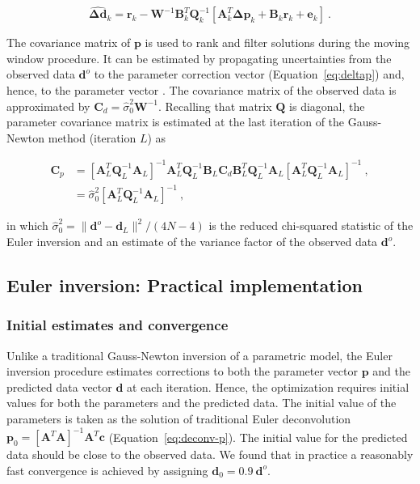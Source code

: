 \begin{equation}
  \hat{\mathbf{\Delta d}}_k =
  \mathbf{r}_k -
  \mathbf{W}^{-1}\mathbf{B}_k^T\mathbf{Q}_k^{-1}
  \left[\mathbf{A}_k^T\mathbf{\Delta p}_k + \mathbf{B}_k\mathbf{r}_k + \mathbf{e}_k\right]
  \ .
  \label{eq:deltad}
\end{equation}

The covariance matrix of $\mathbf{p}$ is used to rank and filter solutions
during the moving window procedure.
It can be estimated by propagating uncertainties from the observed data
$\mathbf{d}^o$ to the
parameter correction vector (Equation~\ref{eq:deltap}) and, hence, to the
parameter vector \citep{WellsKrakiwsky1971}.
The covariance matrix of the observed data is approximated by
$\mathbf{C}_d = \hat{\sigma}_0^2\mathbf{W}^{-1}$.
Recalling that matrix $\mathbf{Q}$ is diagonal,
the parameter covariance matrix is estimated at the last iteration of the
Gauss-Newton method (iteration $L$) as

\begin{equation}
  \begin{aligned}
    \mathbf{C}_{p} &=
      \left[\mathbf{A}_L^T\mathbf{Q}_L^{-1}\mathbf{A}_L\right]^{-1}
      \mathbf{A}_L^T\mathbf{Q}_L^{-1}\mathbf{B}_L
      \mathbf{C}_d
      \mathbf{B}_L^T\mathbf{Q}_L^{-1}\mathbf{A}_L
      \left[\mathbf{A}_L^T\mathbf{Q}_L^{-1}\mathbf{A}_L\right]^{-1}
    \ ,
    \\
    &= \hat{\sigma}_0^2 \left[\mathbf{A}_L^T\mathbf{Q}_L^{-1}\mathbf{A}_L\right]^{-1}
    \ ,
  \end{aligned}
  \label{eq:cov}
\end{equation}

\noindent
in which
$\hat{\sigma}^2_0 = \|\mathbf{d}^o - \mathbf{d}_L\|^2 / (4N - 4)$ is the
reduced chi-squared statistic of the Euler inversion and an estimate of the
variance factor of the observed data $\mathbf{d}^o$.



\subsection{Euler inversion: Practical implementation}

\subsubsection{Initial estimates and convergence}

Unlike a traditional Gauss-Newton inversion of a parametric model, the Euler
inversion procedure estimates corrections to both the parameter vector
$\mathbf{p}$ and the predicted data vector $\mathbf{d}$ at each iteration.
Hence, the optimization requires initial values for both the parameters and the
predicted data.
The initial value of the parameters is taken as the solution of
traditional Euler deconvolution
$\mathbf{p}_0 = \left[\mathbf{A}^T\mathbf{A}\right]^{-1}\mathbf{A}^T\mathbf{c}$
(Equation~\ref{eq:deconv-p}).
The initial value for the predicted data should be close to the observed data.
We found that in practice a reasonably fast convergence is achieved by
assigning $\mathbf{d}_0 = 0.9\ \mathbf{d}^o$.


